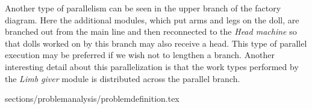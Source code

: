 Another type of parallelism can be seen in the upper branch of the factory diagram. Here the additional modules, which put arms and legs on the doll, are branched out from the main line and then reconnected to the \textit{Head machine} so that dolls worked on by this branch may also receive a head. This type of parallel execution may be preferred if we wish not to lengthen a branch. Another interesting detail about this parallelization is that the work types performed by the \textit{Limb giver} module is distributed across the parallel branch. 




 {sections/problemanalysis/problemdefinition.tex}

